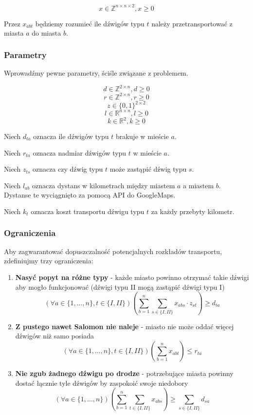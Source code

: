 \documentclass{article}
\theoremstyle{definition}
\theoremstyle{remark}
\theoremstyle{plain}
\theoremstyle{remark}
\theoremstyle{plain}
\begin{document}
\[ x \in \mathbb{Z}^{n\times n\times 2}, x \geq 0 \]

Przez $x_{abt}$ będziemy rozumieć ile dźwigów typu $t$ należy przetransportować z miasta $a$ do miasta $b$.

\subsubsection{Parametry}
Wprowadźmy pewne parametry, ściśle związane z problemem.

\[ d \in \mathbb{Z}^{2\times n}, d \geq 0 \]
\[ r \in \mathbb{Z}^{2\times n}, r \geq 0 \]
\[ z \in \{0,1\}^{2\times 2} \]
\[ l \in \mathbb{R}^{n\times n}, l \geq 0 \]
\[ k \in \mathbb{R}^{2}, k \geq 0 \]

Niech $d_{ta}$ oznacza ile dźwigów typu $t$ brakuje w mieście $a$.

Niech $r_{ta}$ oznacza nadmiar dźwigów typu $t$ w mieście $a$.

Niech $z_{ts}$ oznacza czy dźwig typu $t$ może zastąpić dźwig typu $s$.

Niech $l_{ab}$ oznacza dystans w kilometrach między miastem $a$ a miastem $b$.
Dystanse te wyciągnięto za pomocą API do GoogleMaps.

Niech $k_t$ oznacza koszt transportu dźwigu typu $t$ za każdy przebyty kilometr.

\subsubsection{Ograniczenia}
Aby zagwarantować dopuszczalność potencjalnych rozkładów transportu, zdefiniujmy trzy ograniczenia:
\begin{enumerate}
    \item \textbf{Nasyć popyt na różne typy} - każde miasto powinno otrzymać takie dźwigi aby mogło funkcjonować (dźwigi typu II mogą zastąpić dźwigi typu I)
    \[ (\forall a \in \{1,\dots,n\}, t \in \{I,II\}) \left(\sum_{b=1}^{n}{\sum_{s \in \{I,II\}}{x_{abs} \cdot z_{st}}} \right) \geq d_{ta} \]

    \item \textbf{Z pustego nawet Salomon nie naleje} - miasto nie może oddać więcej dźwigów niż samo posiada
    \[ (\forall a \in \{1,\dots,n\}, t \in \{I,II\}) \left(\sum_{b=1}^{n}{x_{abt}} \right) \leq r_{ta} \]

    \item \textbf{Nie zgub żadnego dźwigu po drodze} - potrzebujące miasta powinny dostać łącznie tyle dźwigów by zaspokoić swoje niedobory
    \[ (\forall a \in \{1,\dots,n\}) \left(\sum_{b=1}^{n}{\sum_{t \in \{I,II\}}{x_{abs}}} \right) \geq \sum_{s \in \{I, II\}}{d_{sa}} \]
\end{enumerate}
\end{document}
